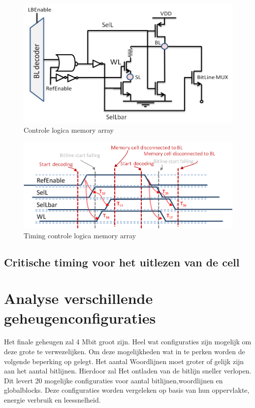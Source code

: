 \begin{figure}[!ht]
  \centering
  \includegraphics[scale=0.6]{../fig/hfdstk-timing-lbref1.png}
  \caption{Controle logica memory array}
  \label{fig:lbref_timing1}
\end{figure}

\begin{figure}[!ht]
  \centering
  \includegraphics[scale=0.9]{../fig/hfdstk-timing-lbref2.png}
  \caption{Timing controle logica memory array}
  \label{fig:lbref_timing2}
\end{figure}

\subsection{Critische timing voor het uitlezen van de cell}

\section{Analyse verschillende geheugenconfiguraties}
\paragraph{}
Het finale geheugen zal 4 Mbit groot zijn. Heel wat configuraties zijn mogelijk om deze grote te verwezelijken. Om deze mogelijkheden wat in te perken worden de volgende beperking op gelegt. Het aantal Woordlijnen moet groter of gelijk zijn aan het aantal bitlijnen. Hierdoor zal Het ontladen van de bitlijn sneller verlopen. Dit levert 20 mogelijke configuraties voor aantal bitlijnen,woordlijnen en globalblocks. Deze configuraties worden vergeleken op basis van hun oppervlakte, energie verbruik en leessnelheid. 

